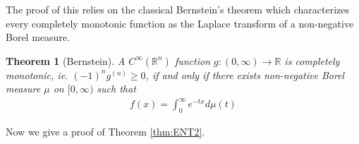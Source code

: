 \documentclass[10pt]{article}
\newcommand{\1}{\textbf{1}}
\newcommand{\R}{\mathbb{R}}
\newtheorem{theorem}{Theorem}[subsection]
\theoremstyle{remark}
\theoremstyle{definition}
\begin{document}
The proof of this relies on the classical Bernstein's theorem which characterizes every completely monotonic function as the Laplace transform of a non-negative Borel measure.

\begin{theorem}[Bernstein]\label{thm:BERNSTEIN}
	A $C^{\infty}(\R^n)$ function $g : (0,\infty) \to \R$ is completely monotonic, ie. $(-1)^ng^{(n)} \geq 0$, if and only if there exists non-negative Borel measure $\mu$ on $[0,\infty)$ such that
	\begin{align*}
		f(x) = \int_0^{\infty} e^{-tx}d\mu(t)
	\end{align*}
\end{theorem}


Now we give a proof of Theorem \ref{thm:ENT2}.
\end{document}
